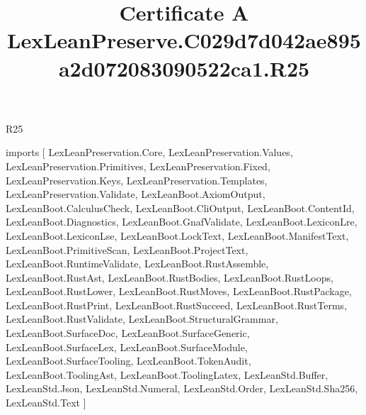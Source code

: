 \begin{lexlean}{R25}
\title{Certificate A LexLeanPreserve.C029d7d042ae895a2d072083090522ca1.R25}
\begin{coremodule}
imports [
  LexLeanPreservation.Core,
  LexLeanPreservation.Values,
  LexLeanPreservation.Primitives,
  LexLeanPreservation.Fixed,
  LexLeanPreservation.Keys,
  LexLeanPreservation.Templates,
  LexLeanPreservation.Validate,
  LexLeanBoot.AxiomOutput,
  LexLeanBoot.CalculusCheck,
  LexLeanBoot.CliOutput,
  LexLeanBoot.ContentId,
  LexLeanBoot.Diagnostics,
  LexLeanBoot.GnafValidate,
  LexLeanBoot.LexiconLre,
  LexLeanBoot.LexiconLse,
  LexLeanBoot.LockText,
  LexLeanBoot.ManifestText,
  LexLeanBoot.PrimitiveScan,
  LexLeanBoot.ProjectText,
  LexLeanBoot.RuntimeValidate,
  LexLeanBoot.RustAssemble,
  LexLeanBoot.RustAst,
  LexLeanBoot.RustBodies,
  LexLeanBoot.RustLoops,
  LexLeanBoot.RustLower,
  LexLeanBoot.RustMoves,
  LexLeanBoot.RustPackage,
  LexLeanBoot.RustPrint,
  LexLeanBoot.RustSucceed,
  LexLeanBoot.RustTerms,
  LexLeanBoot.RustValidate,
  LexLeanBoot.StructuralGrammar,
  LexLeanBoot.SurfaceDoc,
  LexLeanBoot.SurfaceGeneric,
  LexLeanBoot.SurfaceLex,
  LexLeanBoot.SurfaceModule,
  LexLeanBoot.SurfaceTooling,
  LexLeanBoot.TokenAudit,
  LexLeanBoot.ToolingAst,
  LexLeanBoot.ToolingLatex,
  LexLeanStd.Buffer,
  LexLeanStd.Json,
  LexLeanStd.Numeral,
  LexLeanStd.Order,
  LexLeanStd.Sha256,
  LexLeanStd.Text
]


\end{coremodule}
\end{lexlean}
